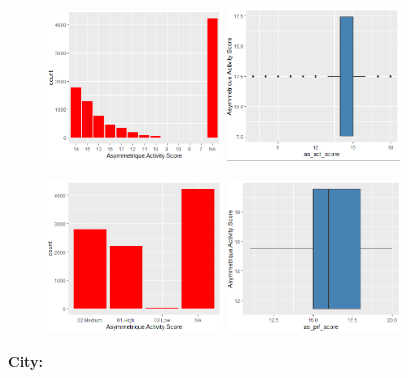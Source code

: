 \begin{figure}[H]
	\begin{center}
		\includegraphics[width=0.41\textwidth]{assets/score_activ.PNG}	
		\includegraphics[width=0.41\textwidth]{assets/as_score.PNG}
	\end{center}
	\begin{center}
		\includegraphics[width=0.41\textwidth]{assets/profil_score.PNG}	
		\includegraphics[width=0.41\textwidth]{assets/as_pr_score.PNG}
	\end{center}
\end{figure}
\textbf{City: }\\
